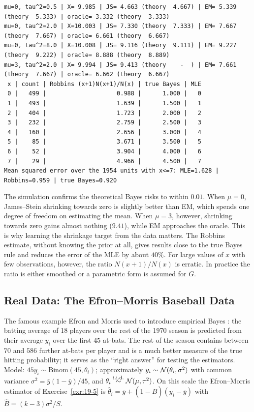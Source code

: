 \documentclass[main.tex]{subfiles}
\begin{document}
\begin{lstlisting}[style=output]
mu=0, tau^2=0.5 | X= 9.985 | JS= 4.663 (theory  4.667) | EM= 5.339 (theory  5.333) | oracle= 3.332 (theory  3.333)
mu=0, tau^2=2.0 | X=10.003 | JS= 7.330 (theory  7.333) | EM= 7.667 (theory  7.667) | oracle= 6.661 (theory  6.667)
mu=0, tau^2=8.0 | X=10.008 | JS= 9.116 (theory  9.111) | EM= 9.227 (theory  9.222) | oracle= 8.888 (theory  8.889)
mu=3, tau^2=2.0 | X= 9.994 | JS= 9.413 (theory    -  ) | EM= 7.661 (theory  7.667) | oracle= 6.662 (theory  6.667)
 x | count | Robbins (x+1)N(x+1)/N(x) | true Bayes | MLE
 0 |   499 |                    0.988 |      1.000 |   0
 1 |   493 |                    1.639 |      1.500 |   1
 2 |   404 |                    1.723 |      2.000 |   2
 3 |   232 |                    2.759 |      2.500 |   3
 4 |   160 |                    2.656 |      3.000 |   4
 5 |    85 |                    3.671 |      3.500 |   5
 6 |    52 |                    3.904 |      4.000 |   6
 7 |    29 |                    4.966 |      4.500 |   7
Mean squared error over the 1954 units with x<=7: MLE=1.628 | Robbins=0.959 | true Bayes=0.920
\end{lstlisting}

The simulation confirms the theoretical Bayes risks to within $0.01$. When $\mu=0$, James--Stein shrinking towards zero is slightly better than EM, which spends one degree of freedom on estimating the mean. When $\mu=3$, however, shrinking towards zero gains almost nothing ($9.41$), while EM approaches the oracle. This is why learning the shrinkage target from the data matters. The Robbins estimate, without knowing the prior at all, gives results close to the true Bayes rule and reduces the error of the MLE by about $40\%$. For large values of $x$ with few observations, however, the ratio $N(x+1)/N(x)$ is erratic. In practice the ratio is either smoothed or a parametric form is assumed for $G$.

\subsection{Real Data: The Efron--Morris Baseball Data}\label{sec:beyzbol}
The famous example Efron and Morris used to introduce empirical Bayes \cite{efron-morris75}: the batting average of 18 players over the rest of the 1970 season is predicted from their average $y_i$ over the first 45 at-bats. The rest of the season contains between $70$ and $586$ further at-bats per player and is a much better measure of the true hitting probability; it serves as the ``right answer'' for testing the estimators. Model: $45y_i\sim\text{Binom}(45,\theta_i)$; approximately $y_i\sim\mathcal{N}(\theta_i,\sigma^2)$ with common variance $\sigma^2=\bar y(1-\bar y)/45$, and $\theta_i\overset{\text{i.i.d.}}{\sim}\mathcal{N}(\mu,\tau^2)$. On this scale the Efron--Morris estimator of Exercise~\ref{exr:19-5} is $\hat\theta_i=\bar y+(1-\hat B)(y_i-\bar y)$ with $\hat B=(k-3)\sigma^2/S$.
\end{document}
